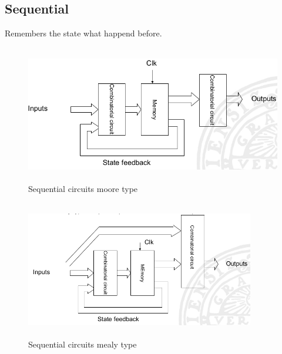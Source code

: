 \documentclass{article}
\begin{document}
\newpage
\subsection{Sequential}
Remembers the state what happend before.

\begin{figure}[h]
    \centering
    \includegraphics[width=12cm, height=6cm]{image/sequential-circuits-moore-type.png}
    \caption{Sequential circuits moore type}
\end{figure}

\begin{figure}[h]
    \vspace{10mm}
    \centering
    \includegraphics[width=10cm, height=6cm]{image/sequential-circuits-mealy-type.png}
    \caption{Sequential circuits mealy type}
\end{figure}

\newpage
\end{document}
